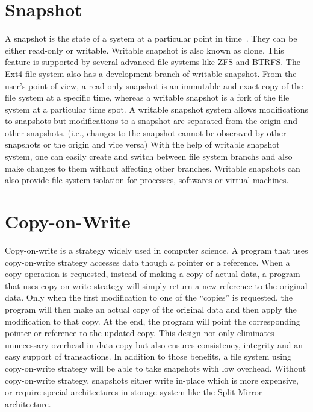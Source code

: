 \section{Snapshot}

    A snapshot is the state of a system at a particular point in time~\cite{btrfscow}. They can be either read-only or writable. Writable snapshot is also known as clone. This feature is  supported by several advanced file systems like ZFS and BTRFS. The Ext4 file system also has a development branch of writable snapshot. From the user's point of view, a read-only snapshot is an immutable and exact copy of the file system at a specific time, whereas a writable snapshot is a fork of the file system at a particular time spot. A writable snapshot system allows modifications to snapshots but modifications to a snapshot are separated from the origin and other snapshots. (i.e., changes to the snapshot cannot be obsersved by other snapshots or the origin and vice versa) With the help of writable snapshot system, one can easily create and switch between file system branchs and also make changes to them without affecting other branches. Writable snapshots can also provide file system isolation for processes, softwares or virtual machines.

\section{Copy-on-Write}

    Copy-on-write is a strategy widely used in computer science. A program that uses copy-on-write strategy accesses data though a pointer or a reference. When a copy operation is requested, instead of making a copy of actual data, a program that uses copy-on-write strategy will simply return a new reference to the original data. Only when the first modification to one of the ``copies'' is requested, the program will then make an actual copy of the original data and then apply the modification to that copy. At the end, the program will point the corresponding pointer or reference to the updated copy. This design not only eliminates unnecessary overhead in data copy but also ensures consistency, integrity and an easy support of transactions. In addition to those benefits, a file system using copy-on-write strategy will be able to take snapshots with low overhead. Without copy-on-write strategy, snapshots either write in-place which is more expensive, or require special architectures in storage system like the Split-Mirror architecture.

